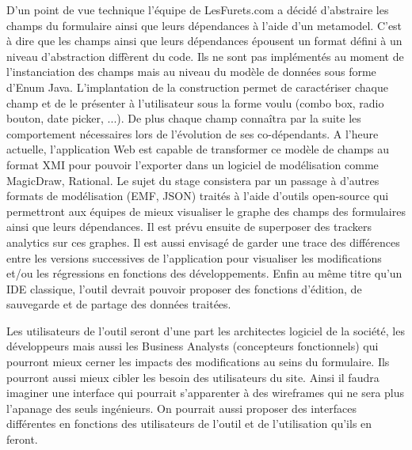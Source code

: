 \documentclass[12pt,a4paper,oldfontcommands]{article}
\begin{document}
D’un point de vue technique l’équipe de LesFurets.com a décidé d’abstraire les champs du formulaire ainsi que leurs dépendances à l’aide d'un metamodel. C'est à dire que les champs ainsi que leurs dépendances épousent un format défini à un niveau d'abstraction diffèrent du code. Ils ne sont pas implémentés au moment de l'instanciation des champs mais au niveau du modèle de données sous forme d'Enum Java. L'implantation de la construction permet de caractériser chaque champ et de le présenter à l'utilisateur sous la forme voulu (combo box, radio bouton, date picker, ...). De plus chaque champ connaîtra par la suite les comportement nécessaires lors de l'évolution de ses co-dépendants.  A l’heure actuelle, l’application Web est capable de transformer ce modèle de champs au format XMI pour pouvoir l'exporter dans un logiciel de modélisation comme MagicDraw, Rational. Le sujet du stage consistera par un passage à d’autres formats de modélisation (EMF, JSON) traités à l'aide d'outils open-source qui permettront aux équipes de mieux visualiser le graphe des champs des formulaires ainsi que leurs dépendances. Il est prévu ensuite de superposer des trackers analytics sur ces graphes. Il est aussi envisagé de garder une trace des différences entre les versions successives de l’application pour visualiser les modifications et/ou les régressions en fonctions des développements. Enfin au même titre qu’un IDE classique, l’outil devrait pouvoir proposer des fonctions d’édition, de sauvegarde et de partage des données traitées. 

Les utilisateurs de l’outil seront d’une part les architectes logiciel de la société, les développeurs mais aussi les Business Analysts (concepteurs fonctionnels) qui pourront mieux cerner les impacts des modifications au seins du formulaire. Ils pourront aussi mieux cibler les besoin des utilisateurs du site. Ainsi il faudra imaginer une interface qui pourrait s'apparenter à des wireframes qui ne sera plus l’apanage des seuls ingénieurs. On pourrait aussi proposer des interfaces différentes en fonctions des utilisateurs de l'outil et de l'utilisation qu'ils en feront.
\end{document}

